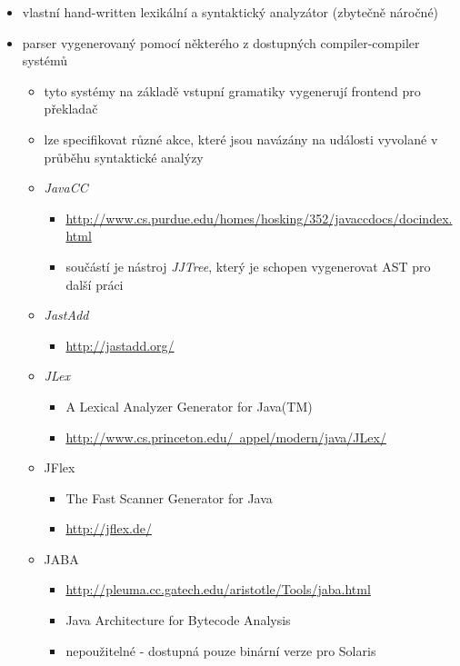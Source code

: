 \begin{itemize}
\item vlastní hand-written lexikální a syntaktický analyzátor (zbytečně náročné)
\item parser vygenerovaný pomocí některého z dostupných compiler-compiler systémů
  \begin{itemize}
  \item tyto systémy na základě vstupní gramatiky vygenerují frontend pro překladač
  \item lze specifikovat různé akce, které jsou navázány na události vyvolané v průběhu syntaktické analýzy
  \item \emph{JavaCC}
    \begin{itemize}
    \item \href{http://www.cs.purdue.edu/homes/hosking/352/javaccdocs/docindex.html}{http://www.cs.purdue.edu/homes/hosking/352/javaccdocs/docindex.html}
    \item součástí je nástroj \emph{JJTree}, který je schopen vygenerovat AST pro další práci
    \end{itemize}
  \item \emph{JastAdd}
    \begin{itemize}
    \item \href{http://jastadd.org/}{http://jastadd.org/}
    \end{itemize}
  \item \emph{JLex}
    \begin{itemize}
    \item A Lexical Analyzer Generator for Java(TM)
    \item \href{http://www.cs.princeton.edu/~appel/modern/java/JLex/}{http://www.cs.princeton.edu/~appel/modern/java/JLex/}
    \end{itemize}
  \item JFlex
    \begin{itemize}
    \item The Fast Scanner Generator for Java
    \item \href{http://jflex.de/}{http://jflex.de/}
    \end{itemize}
  \item JABA
    \begin{itemize}
    \item \href{http://pleuma.cc.gatech.edu/aristotle/Tools/jaba.html}{http://pleuma.cc.gatech.edu/aristotle/Tools/jaba.html}
    \item Java Architecture for Bytecode Analysis
    \item nepoužitelné - dostupná pouze binární verze pro Solaris

\end{itemize}
\end{itemize}
\end{itemize}
